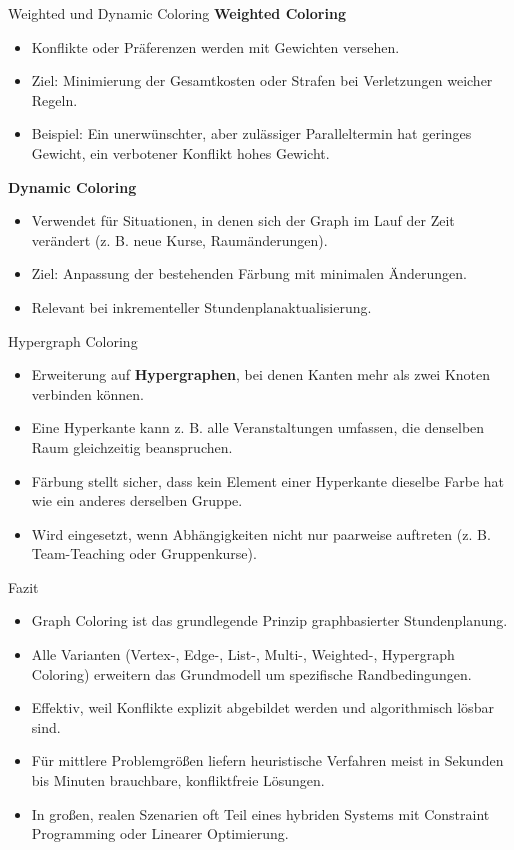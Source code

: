 \documentclass[10pt]{beamer}
\begin{document}
\begin{frame}{Weighted und Dynamic Coloring}
    \small
    \textbf{Weighted Coloring}
    \begin{itemize}
        \item Konflikte oder Präferenzen werden mit Gewichten versehen.
        \item Ziel: Minimierung der Gesamtkosten oder Strafen bei Verletzungen weicher Regeln.
        \item Beispiel: Ein unerwünschter, aber zulässiger Paralleltermin hat geringes Gewicht, ein verbotener Konflikt hohes Gewicht.
    \end{itemize}

    \vspace{0.5em}
    \textbf{Dynamic Coloring}
    \begin{itemize}
        \item Verwendet für Situationen, in denen sich der Graph im Lauf der Zeit verändert (z. B. neue Kurse, Raumänderungen).
        \item Ziel: Anpassung der bestehenden Färbung mit minimalen Änderungen.
        \item Relevant bei inkrementeller Stundenplanaktualisierung.
    \end{itemize}
\end{frame}

\begin{frame}{Hypergraph Coloring}
    \small
    \begin{itemize}
        \item Erweiterung auf \textbf{Hypergraphen}, bei denen Kanten mehr als zwei Knoten verbinden können.
        \item Eine Hyperkante kann z. B. alle Veranstaltungen umfassen, die denselben Raum gleichzeitig beanspruchen.
        \item Färbung stellt sicher, dass kein Element einer Hyperkante dieselbe Farbe hat wie ein anderes derselben Gruppe.
        \item Wird eingesetzt, wenn Abhängigkeiten nicht nur paarweise auftreten (z. B. Team-Teaching oder Gruppenkurse).
    \end{itemize}
\end{frame}

\begin{frame}{Fazit}
    \small
    \begin{itemize}
        \item Graph Coloring ist das grundlegende Prinzip graphbasierter Stundenplanung.
        \item Alle Varianten (Vertex-, Edge-, List-, Multi-, Weighted-, Hypergraph Coloring) erweitern das Grundmodell um spezifische Randbedingungen.
        \item Effektiv, weil Konflikte explizit abgebildet werden und algorithmisch lösbar sind.
        \item Für mittlere Problemgrößen liefern heuristische Verfahren meist in Sekunden bis Minuten brauchbare, konfliktfreie Lösungen.
        \item In großen, realen Szenarien oft Teil eines hybriden Systems mit Constraint Programming oder Linearer Optimierung.
    \end{itemize}
\end{frame}
\end{document}
